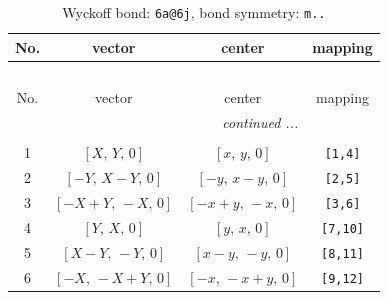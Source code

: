 \documentclass[fleqn,8pt]{jsarticle}
\begin{document}
\begin{longtable}{cccc}
\caption{Wyckoff bond: {\tt 6a@6j}, bond symmetry: {\tt m..}}
 \\
 \hline \hline
No. & vector & center & mapping \\ \hline \endfirsthead

\multicolumn{3}{l}{\tablename\ \thetable{}} \\
 \hline \hline
No. & vector & center & mapping \\ \hline \endhead

 \hline \hline
\multicolumn{3}{r}{\footnotesize\it continued ...} \\ \endfoot

 \hline \hline
\multicolumn{3}{r}{} \\ \endlastfoot

1 & $\left[ X,\, Y,\, 0 \right]$ & $\left[ x,\, y,\, 0 \right]$ & {\tt [1,4]} \\ \hline
2 & $\left[ - Y,\, X - Y,\, 0 \right]$ & $\left[ - y,\, x - y,\, 0 \right]$ & {\tt [2,5]} \\ \hline
3 & $\left[ - X + Y,\, - X,\, 0 \right]$ & $\left[ - x + y,\, - x,\, 0 \right]$ & {\tt [3,6]} \\ \hline
4 & $\left[ Y,\, X,\, 0 \right]$ & $\left[ y,\, x,\, 0 \right]$ & {\tt [7,10]} \\ \hline
5 & $\left[ X - Y,\, - Y,\, 0 \right]$ & $\left[ x - y,\, - y,\, 0 \right]$ & {\tt [8,11]} \\ \hline
6 & $\left[ - X,\, - X + Y,\, 0 \right]$ & $\left[ - x,\, - x + y,\, 0 \right]$ & {\tt [9,12]} \\
\end{longtable}
\renewcommand{\arraystretch}{1.2}
\end{document}
